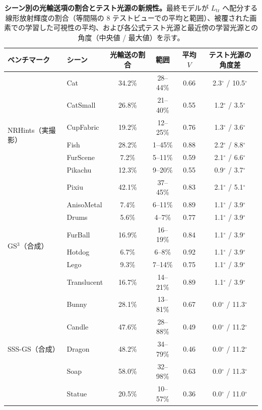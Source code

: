 \begin{table}[t]
\caption{\textbf{シーン別の光輸送項の割合とテスト光源の新規性。}最終モデルが $L_{\mathrm{tr}}$ へ配分する線形放射輝度の割合（等間隔の 8 テストビューでの平均と範囲）、被覆された画素での学習した可視性の平均、および各公式テスト光源と最近傍の学習光源との角度（中央値 / 最大値）を示す。}
\label{tab:supp_shares}
\centering\scriptsize
\setlength{\tabcolsep}{2pt}
\begin{tabular}{@{}llcccc@{}}
\toprule
ベンチマーク & シーン & 光輸送の割合 & 範囲 & 平均 $V$ & テスト光源の角度差 \\
\midrule
\multirow{7}{*}{NRHints（実撮影）} & Cat & 34.2\% & 28--44\% & 0.66 & 2.3$^\circ$ / 10.5$^\circ$ \\
 & CatSmall & 26.8\% & 21--40\% & 0.55 & 1.2$^\circ$ / 3.5$^\circ$ \\
 & CupFabric & 19.2\% & 12--25\% & 0.76 & 1.3$^\circ$ / 3.6$^\circ$ \\
 & Fish & 28.2\% & 1--45\% & 0.88 & 2.2$^\circ$ / 8.8$^\circ$ \\
 & FurScene & 7.2\% & 5--11\% & 0.59 & 2.1$^\circ$ / 6.6$^\circ$ \\
 & Pikachu & 12.3\% & 9--20\% & 0.55 & 0.9$^\circ$ / 3.7$^\circ$ \\
 & Pixiu & 42.1\% & 37--45\% & 0.83 & 2.1$^\circ$ / 5.1$^\circ$ \\
\midrule
\multirow{6}{*}{GS$^3$（合成）} & AnisoMetal & 7.4\% & 6--11\% & 0.89 & 1.1$^\circ$ / 3.9$^\circ$ \\
 & Drums & 5.6\% & 4--7\% & 0.77 & 1.1$^\circ$ / 3.9$^\circ$ \\
 & FurBall & 16.9\% & 16--19\% & 0.84 & 1.1$^\circ$ / 3.9$^\circ$ \\
 & Hotdog & 6.7\% & 6--8\% & 0.92 & 1.1$^\circ$ / 3.9$^\circ$ \\
 & Lego & 9.3\% & 7--14\% & 0.75 & 1.1$^\circ$ / 3.9$^\circ$ \\
 & Translucent & 16.7\% & 14--21\% & 0.89 & 1.1$^\circ$ / 3.9$^\circ$ \\
\midrule
\multirow{5}{*}{SSS-GS（合成）} & Bunny & 28.1\% & 13--81\% & 0.67 & 0.0$^\circ$ / 11.3$^\circ$ \\
 & Candle & 47.6\% & 28--88\% & 0.49 & 0.0$^\circ$ / 11.2$^\circ$ \\
 & Dragon & 48.2\% & 34--79\% & 0.46 & 0.0$^\circ$ / 11.2$^\circ$ \\
 & Soap & 58.0\% & 32--98\% & 0.63 & 0.0$^\circ$ / 11.3$^\circ$ \\
 & Statue & 20.5\% & 10--57\% & 0.36 & 0.0$^\circ$ / 11.0$^\circ$ \\
\bottomrule
\end{tabular}
\end{table}
